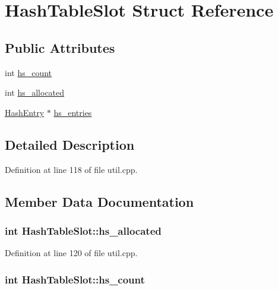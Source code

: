 \hypertarget{structHashTableSlot}{\section{Hash\+Table\+Slot Struct Reference}
\label{structHashTableSlot}
}
\subsection*{Public Attributes}
\begin{DoxyCompactItemize}
\item 
int \hyperlink{structHashTableSlot_aa249ad04bb7f1116b66e560566a03db9}{hs\+\_\+count}
\item 
int \hyperlink{structHashTableSlot_af78b3b5c843a3291b66ba8ea5748acc7}{hs\+\_\+allocated}
\item 
\hyperlink{structHashEntry}{Hash\+Entry} $\ast$ \hyperlink{structHashTableSlot_aa7774f3e87d521e6e1b83dee6511e3f4}{hs\+\_\+entries}
\end{DoxyCompactItemize}


\subsection{Detailed Description}


Definition at line 118 of file util.\+cpp.



\subsection{Member Data Documentation}
\hypertarget{structHashTableSlot_af78b3b5c843a3291b66ba8ea5748acc7}{
\subsubsection[{hs\+\_\+allocated}]{\setlength{\rightskip}{0pt plus 5cm}int Hash\+Table\+Slot\+::hs\+\_\+allocated}}\label{structHashTableSlot_af78b3b5c843a3291b66ba8ea5748acc7}


Definition at line 120 of file util.\+cpp.

\hypertarget{structHashTableSlot_aa249ad04bb7f1116b66e560566a03db9}{
\subsubsection[{hs\+\_\+count}]{\setlength{\rightskip}{0pt plus 5cm}int Hash\+Table\+Slot\+::hs\+\_\+count}}\label{structHashTableSlot_aa249ad04bb7f1116b66e560566a03db9}


